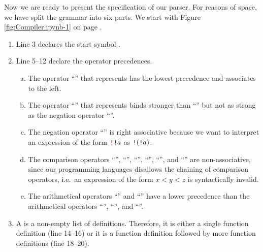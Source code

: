 Now we are ready to present the specification of our parser.  For reasons of space,
we have split the grammar into six parts.  We start with Figure \ref{fig:Compiler.ipynb-1} on page
\pageref{fig:Compiler.ipynb-1}.  
\begin{enumerate}
\item Line 3 declares the start symbol .
\item Line 5--12 declare the operator precedences.
  \begin{enumerate}[(a)]
  \item The operator ``\mytt{||}'' that represents  has the lowest precedence and associates
        to the left.  
  \item The operator ``\mytt{\&\&}'' that represents  binds stronger than ``\mytt{||}''
        but not as strong as  the negation operator ``\mytt{!}''.
  \item The negation operator ``\mytt{!}'' is right associative because we want to interpret an expression of
        the form $\mytt{!!}a$ as  $\mytt{!}(\mytt{!}a)$.
  \item The comparison operators ``\mytt{==}'', ``\mytt{!=}'', ``\mytt{<=}'', ``\mytt{>=}'',
        ``\mytt{<}'', and ``\mytt{>}'' are non-associative, since our programming languages disallows 
        the chaining of comparison operators, i.e.~an expression of the form $x < y < z$ is syntactically
        invalid.
  \item The arithmetical operators ``\mytt{+}'' and ``\mytt{-}'' have a lower precedence than the
        arithmetical operators ``\mytt{*}'', ``\mytt{/}'',  and ``\mytt{\%}''. 
  \end{enumerate}
\item A  is a non-empty list of  definitions.  Therefore, it is either a single
      function definition (line 14--16) or it is a function definition followed by more function definitions
      (line 18--20).


\end{enumerate}
